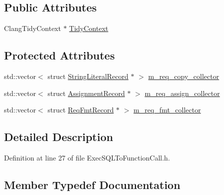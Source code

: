\subsection*{Public Attributes}
\begin{DoxyCompactItemize}
\item 
Clang\+Tidy\+Context $\ast$ \hyperlink{classclang_1_1tidy_1_1pagesjaunes_1_1_exec_s_q_l_to_function_call_a39cc759c9f861841241f73ca62e99aad}{Tidy\+Context}
\end{DoxyCompactItemize}
\subsection*{Protected Attributes}
\begin{DoxyCompactItemize}
\item 
std\+::vector$<$ struct \hyperlink{structclang_1_1tidy_1_1pagesjaunes_1_1_exec_s_q_l_to_function_call_1_1_string_literal_record}{String\+Literal\+Record} $\ast$ $>$ \hyperlink{classclang_1_1tidy_1_1pagesjaunes_1_1_exec_s_q_l_to_function_call_a3b4c1dfa5d4f2bf97a4e624f2bc226e2}{m\+\_\+req\+\_\+copy\+\_\+collector}
\item 
std\+::vector$<$ struct \hyperlink{structclang_1_1tidy_1_1pagesjaunes_1_1_exec_s_q_l_to_function_call_1_1_assignment_record}{Assignment\+Record} $\ast$ $>$ \hyperlink{classclang_1_1tidy_1_1pagesjaunes_1_1_exec_s_q_l_to_function_call_a6bbfd39630959428e368b9a58f072c3e}{m\+\_\+req\+\_\+assign\+\_\+collector}
\item 
std\+::vector$<$ struct \hyperlink{structclang_1_1tidy_1_1pagesjaunes_1_1_exec_s_q_l_to_function_call_1_1_req_fmt_record}{Req\+Fmt\+Record} $\ast$ $>$ \hyperlink{classclang_1_1tidy_1_1pagesjaunes_1_1_exec_s_q_l_to_function_call_a172a86c5ada2ed0e0404a41d2ec9eb94}{m\+\_\+req\+\_\+fmt\+\_\+collector}
\end{DoxyCompactItemize}


\subsection{Detailed Description}


Definition at line 27 of file Exec\+S\+Q\+L\+To\+Function\+Call.\+h.



\subsection{Member Typedef Documentation}
\mbox{\label{classclang_1_1tidy_1_1pagesjaunes_1_1_exec_s_q_l_to_function_call_a23b8970bef757bb65d77350ae5245ed4}} 
